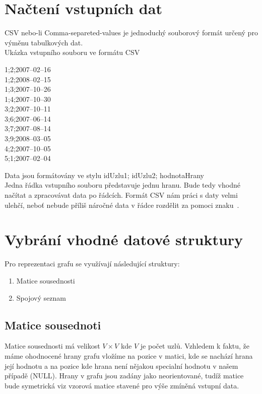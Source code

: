 \section{Načtení vstupních dat}
CSV nebo-li Comma-separeted-values je jednoduchý souborový formát určený pro výměnu tabulkových dat.\\

Ukázka vstupního souboru ve formátu CSV
\begin{framed}
	1;2;2007--02--16\\
	1;2;2008--02--15\\
	1;3;2007--10--26\\
	1;4;2007--10--30\\
	3;2;2007--10--11\\
	3;6;2007--06--14\\
	3;7;2007--08--14\\
	3;9;2008--03--05\\
	4;2;2007--10--05\\
	5;1;2007--02--04
\end{framed}

Data jsou formátovány ve stylu idUzlu1; idUzlu2; hodnotaHrany\\

Jedna řádka vstupního souboru představuje jednu hranu. Bude tedy vhodné načítat a zpracovávat data po řádcích. Formát CSV nám práci s daty velmi ulehčí, neboť nebude příliš náročné data v řádce rozdělit za pomoci znaku~\uv{\textbf{;}}.

\section{Vybrání vhodné datové struktury}
Pro reprezentaci grafu se využívají následující struktury:
\begin{enumerate}
	\item Matice sousednosti
	\item Spojový seznam
\end{enumerate}

\subsection{Matice sousednoti}
Matice sousednosti má velikost $V \times V$ kde $V$ je počet uzlů. Vzhledem k faktu, že máme ohodnocené hrany grafu vložíme na pozice v matici, kde se nachází hrana její hodnotu a na pozice kde hrana není nějakou specialní hodnotu v našem případě (NULL). Hrany v grafu jsou zadány jako neorientované, tudíž matice bude symetrická viz vzorová matice stavené pro výše zmíněná vstupní data.\\

